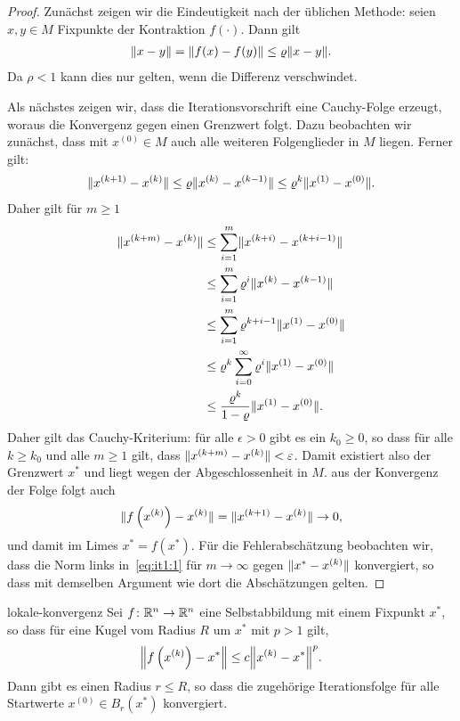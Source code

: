 \begin{proof}
  Zunächst zeigen wir die Eindeutigkeit nach der üblichen Methode:
  seien $x,y\in M$ Fixpunkte der Kontraktion $f(\cdot)$. Dann gilt
  \begin{gather}
    \lVert x-y\rVert = \lVert f(x)-f(y)\rVert \le \varrho \lVert x-y\rVert.
  \end{gather}
  Da $\rho<1$ kann dies nur gelten, wenn die Differenz verschwindet.

  Als nächstes zeigen wir, dass die Iterationsvorschrift eine
  Cauchy-Folge erzeugt, woraus die Konvergenz gegen einen Grenzwert
  folgt. Dazu beobachten wir zunächst, dass mit $x^{(0)}\in M$ auch
  alle weiteren Folgenglieder in $M$ liegen. Ferner gilt:
  \begin{gather}
    \lVert x^{(k+1)}-x^{(k)}\rVert \le \varrho \lVert x^{(k)}-x^{(k-1)}\rVert
    \le \varrho^k\lVert x^{(1)}-x^{(0)}\rVert.
  \end{gather}
  Daher gilt für $m\ge 1$
  \begin{align}
    \label{eq:it1:1}
    \lVert x^{(k+m)}-x^{(k)}\rVert
    &\le \sum_{i=1}^m \lVert x^{(k+i)}-x^{(k+i-1)}\rVert\\
    & \le \sum_{i=1}^m \varrho^{i} \lVert x^{(k)}-x^{(k-1)}\rVert\\
    & \le \sum_{i=1}^m \varrho^{k+i-1} \lVert x^{(1)}-x^{(0)}\rVert\\
    & \le \varrho^k \sum_{i=0}^\infty \varrho^i \lVert x^{(1)}-x^{(0)}\rVert\\
    & \le \frac{\varrho^k}{1-\varrho} \lVert x^{(1)}-x^{(0)}\rVert. 
  \end{align}
  Daher gilt das Cauchy-Kriterium: für alle $\epsilon>0$ gibt es ein
  $k_0\ge 0$, so dass für alle $k\ge k_0$ und alle $m\ge 1$ gilt, dass
  $\lVert x^{(k+m)}-x^{(k)}\rVert < \varepsilon$. Damit existiert also der
  Grenzwert $x^*$ und liegt wegen der Abgeschlossenheit in $M$. aus
  der Konvergenz der Folge folgt auch
  \begin{gather}
    \lVert f\left(x^{(k)}\right)-x^{(k)}\rVert = \lVert x^{(k+1)}-x^{(k)}\rVert
    \to 0,
  \end{gather}
  und damit im Limes $x^* = f(x^*)$. Für die Fehlerabschätzung
  beobachten wir, dass die Norm links in~\eqref{eq:it1:1} für
  $m\to\infty$ gegen $\lVert x^*-x^{(k)}\rVert$ konvergiert, so dass mit
  demselben Argument wie dort die Abschätzungen gelten.
\end{proof}

\begin{Satz}{lokale-konvergenz}
  Sei $f\colon \mathbb R^n\to \mathbb R^n$ eine Selbstabbildung mit einem Fixpunkt
  $x^*$, so dass für eine Kugel vom Radius $R$ um $x^*$ mit $p>1$ gilt,
  \begin{gather}
    \norm*{f\left(x^{(k)}\right) - x^*}
    \le c \norm*{x^{(k)}-x^*}^p.
  \end{gather}
  Dann gibt es einen Radius $r\le R$, so dass die zugehörige
  Iterationsfolge für alle Startwerte $x^{(0)}\in B_r(x^*)$
  konvergiert.
\end{Satz}

